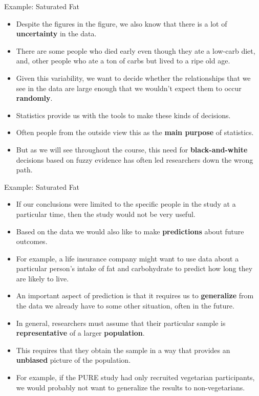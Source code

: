 \documentclass[handout]{beamer}
\begin{document}
\begin{frame}{Example: Saturated Fat}

\scriptsize{
\begin{itemize}
\item Despite the figures in the figure, we also know that there is a lot of \textbf{uncertainty} in the data.
\item There are some people who died early even though they ate a low-carb diet, and, other people who ate a ton of carbs but lived to a ripe old age. 
\item Given this variability, we want to decide whether the relationships that we see in the data are large enough that we wouldn't expect them to occur \textbf{randomly}.
\item Statistics provide us with the tools to make these kinds of decisions.
\item Often people from the outside view this as the \textbf{main purpose} of statistics. 
\item But as we will see throughout the course, this need for \textbf{black-and-white} decisions based on fuzzy evidence has often led researchers down the wrong path.
\end{itemize}

}
 
\end{frame}


\begin{frame}{Example: Saturated Fat}

\scriptsize{
\begin{itemize}
\item If our conclusions were limited to the specific people in the study at a particular time, then the study would not be very useful. 
\item Based on the data we would also like to make \textbf{predictions} about future outcomes. 
\item For example, a life insurance company might want to use data about a particular person's intake of fat and carbohydrate to predict how long they are likely to live.
\item An important aspect of prediction is that it requires us to \textbf{generalize} from the data we already have to some other situation, often in the future.
\item In general, researchers must assume that their particular sample is \textbf{representative} of a larger \textbf{population}.
\item This requires that they obtain the sample in a way that provides an \textbf{unbiased} picture of the population. 
\item For example, if the PURE study had only recruited vegetarian participants, we would probably not want to generalize the results to non-vegetarians.
\end{itemize}

}
 
\end{frame}
\end{document}

